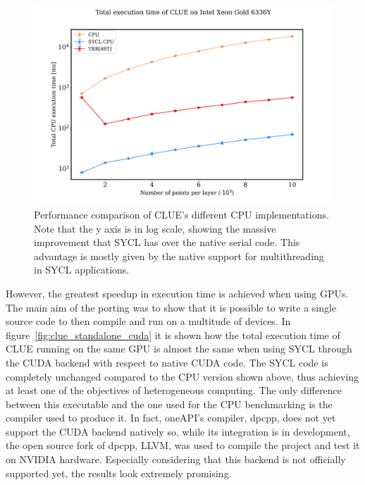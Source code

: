 \begin{figure}[H]
    \centering
    \includegraphics[width=\textwidth]{media/clue_standalone_cpu.png}
    \caption{Performance comparison of CLUE's different CPU implementations. Note that the y axis is in log scale, showing the massive improvement that SYCL has over the native serial code. This advantage is mostly given by the native support for multithreading in SYCL applications.}
    \label{fig:clue_standalone_cpu}
\end{figure}

However, the greatest speedup in execution time is achieved when using GPUs. The main aim of the porting was to show that it is possible to write a single source code to then compile and run on a multitude of devices. In figure~\ref{fig:clue_standalone_cuda} it is shown how the total execution time of CLUE running on the same GPU is almost the same when using SYCL through the CUDA backend with respect to native CUDA code. The SYCL code is completely unchanged compared to the CPU version shown above, thus achieving at least one of the objectives of heterogeneous computing. The only difference between this executable and the one used for the CPU benchmarking is the compiler used to produce it. In fact, oneAPI's compiler, dpcpp, does not yet support the CUDA backend natively so, while its integration is in development, the open source fork of dpcpp, LLVM, was used to compile the project and test it on NVIDIA hardware. Especially considering that this backend is not officially supported yet, the results look extremely promising.

